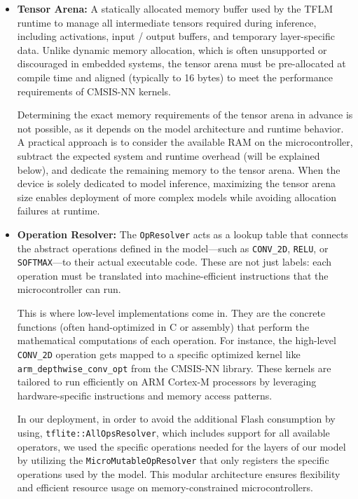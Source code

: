 \begin{itemize}
    \item \textbf{Tensor Arena:} 
    A statically allocated memory buffer used by the TFLM runtime to manage all intermediate tensors required during inference, including activations, input / output buffers, and temporary layer-specific data. Unlike dynamic memory allocation, which is often unsupported or discouraged in embedded systems, the tensor arena must be pre-allocated at compile time and aligned (typically to 16 bytes) to meet the performance requirements of CMSIS-NN kernels.
    
    Determining the exact memory requirements of the tensor arena in advance is not possible, as it depends on the model architecture and runtime behavior. A practical approach is to consider the available RAM on the microcontroller, subtract the expected system and runtime overhead (will be explained below), and dedicate the remaining memory to the tensor arena. When the device is solely dedicated to model inference, maximizing the tensor arena size enables deployment of more complex models while avoiding allocation failures at runtime.

    \item \textbf{Operation Resolver:} 
    The \texttt{OpResolver} acts as a lookup table that connects the abstract operations defined in the model—such as \texttt{CONV\_2D}, \texttt{RELU}, or \texttt{SOFTMAX}—to their actual executable code. These are not just labels: each operation must be translated into machine-efficient instructions that the microcontroller can run.

    This is where low-level implementations come in. They are the concrete functions (often hand-optimized in C or assembly) that perform the mathematical computations of each operation. For instance, the high-level \texttt{CONV\_2D} operation gets mapped to a specific optimized kernel like \texttt{arm\_depthwise\_conv\_opt} from the CMSIS-NN library. These kernels are tailored to run efficiently on ARM Cortex-M processors by leveraging hardware-specific instructions and memory access patterns.

    
    In our deployment, in order to avoid the additional Flash consumption by using, \texttt{tflite::AllOpsResolver}, which includes support for all available operators, we used the specific operations needed for the layers of our model by  utilizing the  \texttt{MicroMutableOpResolver} that only registers the specific operations used by the model. This modular architecture ensures flexibility and efficient resource usage on memory-constrained microcontrollers.


\end{itemize}
